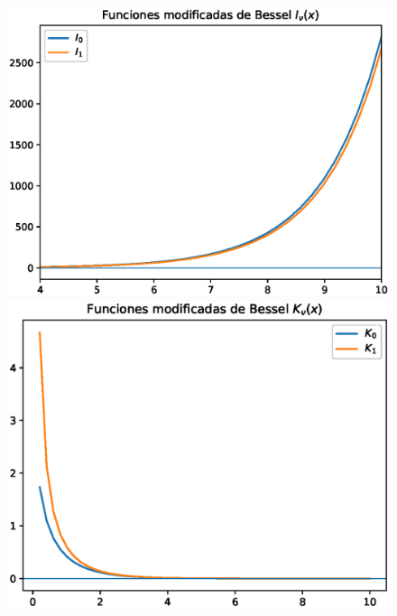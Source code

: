\begin{figure}[H]
    \centering
    \begin{minipage}{0.4\linewidth}
        \includegraphics[scale=0.6]{Imagenes/plot_Modificadas_Bessel_01.eps}
    \end{minipage}
    \hspace{1cm}
    \begin{minipage}{0.4\linewidth}
        \includegraphics[scale=0.6]{Imagenes/plot_Modificadas_Bessel_02.eps}
    \end{minipage}
\end{figure}
